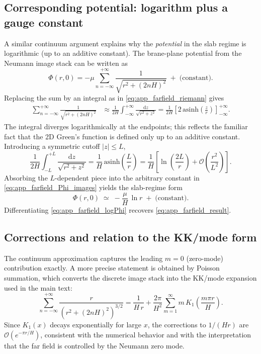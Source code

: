 \documentclass[11pt]{article}
\newcommand{\dd}{\mathrm{d}}
\begin{document}
\subsection{Corresponding potential: logarithm plus a gauge constant}
A similar continuum argument explains why the \emph{potential} in the slab regime is logarithmic
(up to an additive constant).
The brane-plane potential from the Neumann image stack can be written as
\begin{equation}
  \Phi(r,0) = -\mu \sum_{n=-\infty}^{+\infty}\frac{1}{\sqrt{r^2+(2nH)^2}} \;+\; \text{(constant)}.
  \label{eq:app_farfield_Phi_images}
\end{equation}
Replacing the sum by an integral as in \eqref{eq:app_farfield_riemann} gives
\begin{align}
  \sum_{n=-\infty}^{+\infty}\frac{1}{\sqrt{r^2+(2nH)^2}}
  &\approx \frac{1}{2H}\int_{-\infty}^{+\infty}\frac{\dd z}{\sqrt{r^2+z^2}}
   = \frac{1}{2H}\left[ 2\,\mathrm{asinh}\!\left(\frac{z}{r}\right)\right]_{-\infty}^{+\infty}.
\end{align}
The integral diverges logarithmically at the endpoints; this reflects the familiar fact that the
2D Green's function is defined only up to an additive constant.
Introducing a symmetric cutoff $|z|\le L$,
\begin{equation}
  \frac{1}{2H}\int_{-L}^{+L}\frac{\dd z}{\sqrt{r^2+z^2}}
  = \frac{1}{H}\,\mathrm{asinh}\!\left(\frac{L}{r}\right)
  = \frac{1}{H}\left[\ln\!\left(\frac{2L}{r}\right) + \mathcal{O}\!\left(\frac{r^2}{L^2}\right)\right].
\end{equation}
Absorbing the $L$-dependent piece into the arbitrary constant in \eqref{eq:app_farfield_Phi_images}
yields the slab-regime form
\begin{equation}
  \Phi(r,0)\;\simeq\; -\frac{\mu}{H}\,\ln r \;+\; \text{(constant)}.
  \label{eq:app_farfield_logPhi}
\end{equation}
Differentiating \eqref{eq:app_farfield_logPhi} recovers \eqref{eq:app_farfield_result}.

\subsection{Corrections and relation to the KK/mode form}
The continuum approximation captures the leading $m=0$ (zero-mode) contribution exactly.
A more precise statement is obtained by Poisson summation, which converts the discrete image stack
into the KK/mode expansion used in the main text:
\begin{equation}
  \sum_{n=-\infty}^{+\infty}
  \frac{r}{\left(r^2+(2nH)^2\right)^{3/2}}
  =
  \frac{1}{H\,r}
  + \frac{2\pi}{H^2}\sum_{m=1}^{\infty}
  m\,K_1\!\left(\frac{m\pi r}{H}\right).
\end{equation}
Since $K_1(x)$ decays exponentially for large $x$, the corrections to $1/(Hr)$ are
$\mathcal{O}(e^{-\pi r/H})$, consistent with the numerical behavior and with the interpretation
that the far field is controlled by the Neumann zero mode.
\end{document}
